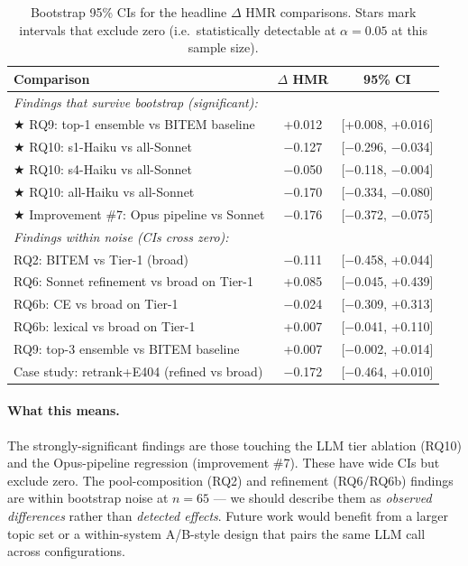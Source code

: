 \documentclass[11pt,a4paper]{article}
\newcommand{\HMR}{\textsc{HMR}}
\begin{document}
\begin{table}[t]
\centering
\caption{Bootstrap 95\% CIs for the headline $\Delta$ \HMR{} comparisons.
Stars mark intervals that exclude zero (i.e.\ statistically detectable at
$\alpha = 0.05$ at this sample size).}
\label{tab:bootstrap}
\begin{tabular}{lcc}
\toprule
Comparison & $\Delta$ \HMR & 95\% CI \\
\midrule
\multicolumn{3}{l}{\emph{Findings that survive bootstrap (significant):}} \\
$\bigstar$ RQ9: top-1 ensemble vs BITEM baseline & +0.012 & {[+0.008, +0.016]} \\
$\bigstar$ RQ10: s1-Haiku vs all-Sonnet           & $-$0.127 & {[$-$0.296, $-$0.034]} \\
$\bigstar$ RQ10: s4-Haiku vs all-Sonnet           & $-$0.050 & {[$-$0.118, $-$0.004]} \\
$\bigstar$ RQ10: all-Haiku vs all-Sonnet          & $-$0.170 & {[$-$0.334, $-$0.080]} \\
$\bigstar$ Improvement \#7: Opus pipeline vs Sonnet & $-$0.176 & {[$-$0.372, $-$0.075]} \\
\midrule
\multicolumn{3}{l}{\emph{Findings within noise (CIs cross zero):}} \\
RQ2: BITEM vs Tier-1 (broad)                    & $-$0.111 & {[$-$0.458, +0.044]} \\
RQ6: Sonnet refinement vs broad on Tier-1       & +0.085 & {[$-$0.045, +0.439]} \\
RQ6b: CE vs broad on Tier-1                     & $-$0.024 & {[$-$0.309, +0.313]} \\
RQ6b: lexical vs broad on Tier-1                & +0.007 & {[$-$0.041, +0.110]} \\
RQ9: top-3 ensemble vs BITEM baseline            & +0.007 & {[$-$0.002, +0.014]} \\
Case study: retrank+E404 (refined vs broad)     & $-$0.172 & {[$-$0.464, +0.010]} \\
\bottomrule
\end{tabular}
\end{table}

\paragraph{What this means.} The strongly-significant findings are
those touching the LLM tier ablation (RQ10) and the Opus-pipeline
regression (improvement \#7). These have wide CIs but exclude zero.
The pool-composition (RQ2) and refinement (RQ6/RQ6b) findings are
within bootstrap noise at $n=65$ — we should describe them as
\emph{observed differences} rather than \emph{detected effects}.
Future work would benefit from a larger topic set or a within-system
A/B-style design that pairs the same LLM call across configurations.
\end{document}
